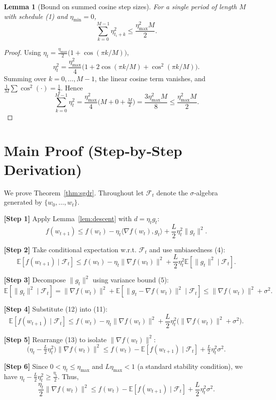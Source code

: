 \documentclass{article}
\newtheorem{lemma}{Lemma}
\newcommand{\E}{\mathbb{E}}
\begin{document}
\begin{lemma}[Bound on summed cosine step sizes]\label{lem:cosine}
For a single period of length $M$ with schedule (1) and $\eta_{\min}=0$,
\[
\sum_{k=0}^{M-1}\eta_{t_i+k}^2
\le \frac{\eta_{\max}^2 M}{2}.
\tag{9}
\]
\end{lemma}
\begin{proof}
Using $\eta_{t}= \frac{\eta_{\max}}{2}\bigl(1+\cos(\pi k/M)\bigr)$,
\[
\eta_{t}^2 = \frac{\eta_{\max}^2}{4}\bigl(1+2\cos(\pi k/M)+\cos^2(\pi k/M)\bigr).
\]
Summing over $k=0,\dots,M-1$, the linear cosine term vanishes, and $\frac{1}{M}\sum\cos^2(\cdot)=\frac12$. Hence
\[
\sum_{k=0}^{M-1}\eta_{t}^2 = \frac{\eta_{\max}^2}{4}\bigl(M + 0 + \tfrac{M}{2}\bigr)=\frac{3\eta_{\max}^2 M}{8}\le \frac{\eta_{\max}^2 M}{2}.
\]
\end{proof}

\section*{Main Proof (Step‑by‑Step Derivation)}
We prove Theorem~\ref{thm:sgdr}. Throughout let $\mathcal F_t$ denote the $\sigma$‑algebra generated by $\{w_0,\dots,w_t\}$.

\noindent\textbf{[Step 1]} Apply Lemma~\ref{lem:descent} with $d=\eta_t g_t$:
\[
f(w_{t+1})\le f(w_t)-\eta_t\langle\nabla f(w_t),g_t\rangle+\frac{L}{2}\eta_t^2\|g_t\|^2.
\tag{10}
\]

\noindent\textbf{[Step 2]} Take conditional expectation w.r.t. $\mathcal F_t$ and use unbiasedness (4):
\[
\E\!\left[f(w_{t+1})\mid\mathcal F_t\right]
\le f(w_t)-\eta_t\|\nabla f(w_t)\|^2
+\frac{L}{2}\eta_t^2\E\!\left[\|g_t\|^2\mid\mathcal F_t\right].
\tag{11}
\]

\noindent\textbf{[Step 3]} Decompose $\|g_t\|^2$ using variance bound (5):
\[
\E\!\left[\|g_t\|^2\mid\mathcal F_t\right]
= \|\nabla f(w_t)\|^2+\E\!\left[\|g_t-\nabla f(w_t)\|^2\mid\mathcal F_t\right]
\le \|\nabla f(w_t)\|^2+\sigma^2.
\tag{12}
\]

\noindent\textbf{[Step 4]} Substitute (12) into (11):
\[
\E\!\left[f(w_{t+1})\mid\mathcal F_t\right]
\le f(w_t)-\eta_t\|\nabla f(w_t)\|^2
+\frac{L}{2}\eta_t^2\bigl(\|\nabla f(w_t)\|^2+\sigma^2\bigr).
\tag{13}
\]

\noindent\textbf{[Step 5]} Rearrange (13) to isolate $\|\nabla f(w_t)\|^2$:
\[
\bigl(\eta_t-\tfrac{L}{2}\eta_t^2\bigr)\|\nabla f(w_t)\|^2
\le f(w_t)-\E\!\left[f(w_{t+1})\mid\mathcal F_t\right]
+\tfrac{L}{2}\eta_t^2\sigma^2.
\tag{14}
\]

\noindent\textbf{[Step 6]} Since $0<\eta_t\le\eta_{\max}$ and $L\eta_{\max}<1$ (a standard stability condition), we have $\eta_t-\frac{L}{2}\eta_t^2\ge\frac{\eta_t}{2}$. Thus,
\[
\frac{\eta_t}{2}\|\nabla f(w_t)\|^2
\le f(w_t)-\E\!\left[f(w_{t+1})\mid\mathcal F_t\right]
+\frac{L}{2}\eta_t^2\sigma^2.
\tag{15}
\]
\end{document}
